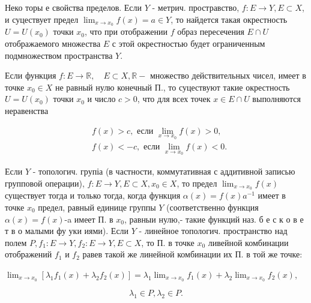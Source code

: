 \documentclass[10pt]{article}
\begin{document}
Неко торы е свойства пределов. Если $Y$ - метрич. простравство, $f: E \rightarrow Y, E \subset X$, и суцествует предел $\lim _{x \rightarrow x_{0}} f(x)=a \in Y$, то найдется такая окрестность $U=U\left(x_{0}\right)$ точки $x_{0}$, что при отображении $f$ образ пересечения $E \cap U$ отображаемого множества $E$ с этой окрестностью будет ограниченным подмножеством пространства $Y$.



Если функция $f: E \rightarrow \mathbb{R}, \quad E \subset X, \mathbb{R}-$ множество действительных чисел, имеет в точке $x_{0} \in X$ не равный нулю конечный П., то суцествуют такие окрестность $U=U\left(x_{0}\right)$ точки $x_{0}$ и число $c>0$, что для всех точек $x \in E \cap U$ выполняются неравенства



\[

\begin{aligned}

& f(x)>c, \text { если } \lim _{x \rightarrow x_{0}} f(x)>0, \\

& f(x)<-c, \text { если } \lim _{x \rightarrow x_{0}} f(x)<0 .

\end{aligned}

\]



Если $Y$ - топологич. групіа (в частности, коммутативная с аддитивной записью групповой операции), $f: E \rightarrow Y, E \subset X, x_{0} \in X$, то предел $\lim _{x \rightarrow x_{0}} f(x)$ существует тогда и только тогда, когда функция $\alpha(x)=f(x) a^{-1}$ имеет в точке $x_{0}$ предел, равный единице группы $Y$ (соответственно функция $\alpha(x)=f(x)$-a имеет П. в $x_{0}$, равныи нулю,- такие функций наз. б е с к о в е т в о малыми фу уки иями). Если $Y$ - линейное топологич. пространство над полем $P, f_{1}: E \rightarrow Y, f_{2}: E \rightarrow Y, E \subset X$, то П. в точке $x_{0}$ ливейной комбинации отображений $f_{1}$ и $f_{2}$ равев такой же линейной комбинации их П. в той же точке:



$\lim _{x \rightarrow x_{0}}\left[\lambda_{1} f_{1}(x)+\lambda_{2} f_{2}(x)\right]=\lambda_{1} \lim _{x \rightarrow x_{0}} f_{1}(x)+\lambda_{2} \lim _{x \rightarrow x_{0}} f_{2}(x)$,



\[

\lambda_{1} \in P, \lambda_{2} \in P .

\]
\end{document}
